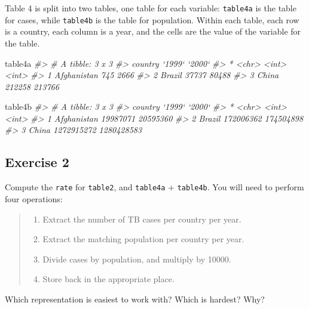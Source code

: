 \documentclass[]{book}
\newenvironment{Shaded}{\begin{snugshade}}{\end{snugshade}}
\newcommand{\CommentTok}[1]{\textcolor[rgb]{0.56,0.35,0.01}{\textit{#1}}}
\newcommand{\NormalTok}[1]{#1}
\providecommand{\tightlist}{%
  \setlength{\itemsep}{0pt}\setlength{\parskip}{0pt}}
\theoremstyle{definition}
\theoremstyle{definition}
\theoremstyle{definition}
\theoremstyle{remark}
\begin{document}
Table 4 is split into two tables, one table for each variable:
\texttt{table4a} is the table for cases, while \texttt{table4b} is the
table for population. Within each table, each row is a country, each
column is a year, and the cells are the value of the variable for the
table.

\begin{Shaded}
\begin{Highlighting}[]
\NormalTok{table4a}
\CommentTok{#> # A tibble: 3 x 3}
\CommentTok{#>   country     `1999` `2000`}
\CommentTok{#> * <chr>        <int>  <int>}
\CommentTok{#> 1 Afghanistan    745   2666}
\CommentTok{#> 2 Brazil       37737  80488}
\CommentTok{#> 3 China       212258 213766}
\end{Highlighting}
\end{Shaded}

\begin{Shaded}
\begin{Highlighting}[]
\NormalTok{table4b}
\CommentTok{#> # A tibble: 3 x 3}
\CommentTok{#>   country         `1999`     `2000`}
\CommentTok{#> * <chr>            <int>      <int>}
\CommentTok{#> 1 Afghanistan   19987071   20595360}
\CommentTok{#> 2 Brazil       172006362  174504898}
\CommentTok{#> 3 China       1272915272 1280428583}
\end{Highlighting}
\end{Shaded}

\hypertarget{exercise-2-15}{%
\subsection{Exercise 2}\label{exercise-2-15}}

Compute the \texttt{rate} for \texttt{table2}, and \texttt{table4a} +
\texttt{table4b}. You will need to perform four operations:

\begin{quote}
\begin{enumerate}
\def\labelenumi{\arabic{enumi}.}
\tightlist
\item
  Extract the number of TB cases per country per year.
\item
  Extract the matching population per country per year.
\item
  Divide cases by population, and multiply by 10000.
\item
  Store back in the appropriate place.
\end{enumerate}
\end{quote}

Which representation is easiest to work with? Which is hardest? Why?
\end{document}
